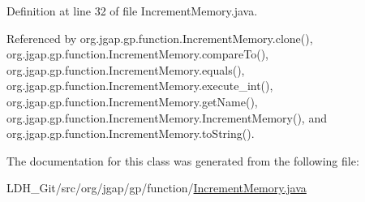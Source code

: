 Definition at line 32 of file Increment\-Memory.\-java.



Referenced by org.\-jgap.\-gp.\-function.\-Increment\-Memory.\-clone(), org.\-jgap.\-gp.\-function.\-Increment\-Memory.\-compare\-To(), org.\-jgap.\-gp.\-function.\-Increment\-Memory.\-equals(), org.\-jgap.\-gp.\-function.\-Increment\-Memory.\-execute\-\_\-int(), org.\-jgap.\-gp.\-function.\-Increment\-Memory.\-get\-Name(), org.\-jgap.\-gp.\-function.\-Increment\-Memory.\-Increment\-Memory(), and org.\-jgap.\-gp.\-function.\-Increment\-Memory.\-to\-String().



The documentation for this class was generated from the following file\-:\begin{DoxyCompactItemize}
\item 
L\-D\-H\-\_\-\-Git/src/org/jgap/gp/function/\hyperlink{_increment_memory_8java}{Increment\-Memory.\-java}\end{DoxyCompactItemize}
